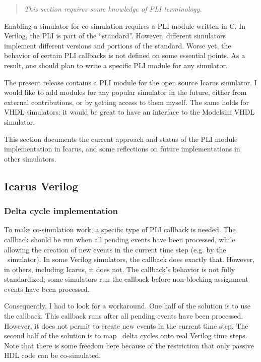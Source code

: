 \begin{quote}
\em
This section requires some knowledge of PLI terminology.
\end{quote}

Enabling a simulator for co-simulation requires a PLI module
written in C. In Verilog, the PLI is part of the ``standard''.
However, different simulators implement different versions 
and portions of the standard. Worse yet, the behavior of
certain PLI callbacks is not defined on some essential points. 
As a result, one should plan to write a specific PLI module
for any simulator.

The present release contains a PLI module for the 
open source Icarus simulator. I would like to add
modules for any popular simulator in the future,
either from external contributions, or by getting
access to them myself. The same holds for VHDL
simulators: it would be great to have an interface
to the Modelsim VHDL simulator.

This section documents
the current approach and status of the PLI module
implementation in Icarus, and some reflections
on future implementations in other simulators.

\subsection{Icarus Verilog}

\subsubsection{Delta cycle implementation}
\label{icarus-delta-cycles}

To make co-simulation work, a specific type of PLI callback is
needed. The callback should be run when all pending events have been
processed, while allowing the creation of new events in the current
time step (e.g. by the \myhdl\ simulator).  In some Verilog
simulators, the  callback does exactly
that. However, in others, including Icarus, it does not. The
callback's behavior is not fully standardized; some simulators run the
callback before non-blocking assignment events have been processed.

Consequently, I had to look for a workaround. One half of the solution
is to use the  callback.  This callback runs
after all pending events have been processed.  However, it does not
permit to create new events in the current time step.  The second half
of the solution is to map \myhdl\ delta cycles onto real Verilog time
steps.  Note that there is some freedom here because of the
restriction that only passive HDL code can be co-simulated.

